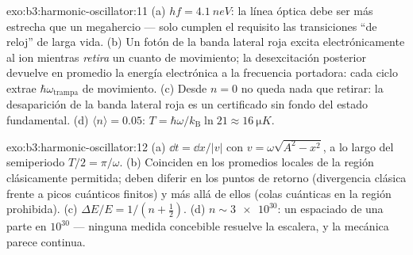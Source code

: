 \begin{solution}{exo:b3:harmonic-oscillator:11}
(a) $hf = \qty{4.1}{neV}$: la línea óptica debe ser más estrecha que un
megahercio --- solo cumplen el requisito las transiciones ``de reloj'' de
larga vida. (b) Un fotón de la banda lateral roja excita electrónicamente al
ion mientras \emph{retira} un cuanto de movimiento; la desexcitación
posterior devuelve en promedio la energía electrónica a la frecuencia
portadora: cada ciclo extrae $\hbar\omega_{\text{trampa}}$ de movimiento. (c) Desde $n = 0$
no queda nada que retirar: la desaparición de la banda lateral roja es
un certificado sin fondo del estado fundamental. (d)
$\langle n\rangle = 0.05$: $T = \hbar\omega/k_{\text{B}}\ln21
\approx \qty{16}{\micro K}$.
\end{solution}

\begin{solution}{exo:b3:harmonic-oscillator:12}
(a) $\dd t = \dd x/|v|$ con $v = \omega\sqrt{A^2 - x^2}$, a lo largo del
semiperiodo $T/2 = \pi/\omega$. (b) Coinciden en los promedios locales de
la región clásicamente permitida; deben diferir en los puntos de
retorno (divergencia clásica frente a picos cuánticos finitos) y más allá de
ellos (colas cuánticas en la región prohibida). (c) $\Delta E/E = 1/(n +
\tfrac12)$. (d) $n \sim \num{3e30}$: un espaciado de una parte en $10^{30}$
--- ninguna medida concebible resuelve la escalera, y la mecánica parece
continua.
\end{solution}

